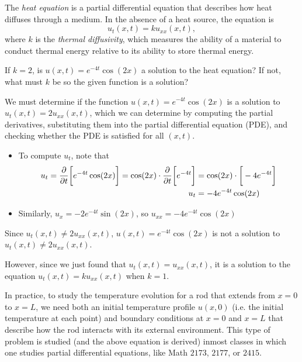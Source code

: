 \documentclass[noauthor,handout]{ximera}
\begin{document}
\begin{problem}
The \emph{heat equation} is a partial differential equation that describes how heat diffuses through a medium.  In the absence of a heat source, the equation is
\[
u_t(x,t) = k u_{xx}(x,t),
\]
where $k$ is the \emph{thermal diffusivity}, which measures the ability of a material to conduct thermal energy relative to its ability to store thermal energy.

If $k=2$, is $u(x,t) = e^{-4t}\cos(2x)$ a solution to the heat equation?  If not, what must $k$ be so the given function is a solution?

\begin{freeResponse}

We must determine if the function $u(x,t) = e^{-4t}\cos(2x)$ is a solution to $u_t(x,t) = 2 u_{xx}(x,t)$, which we can determine by computing the partial derivatives, substituting them into the partial differential equation (PDE), and checking whether the PDE is satisfied for all $(x,t)$.

\begin{itemize}
\item To compute $u_t$, note that 
\begin{align*}
u_t = \frac{\partial }{\partial t} \bigg[ e^{-4t}\cos(2x) \bigg] = \cos(2x) \cdot \frac{\partial }{\partial t} \bigg[ e^{-4t} \bigg] &= \cos(2x) \cdot \bigg[ -4e^{-4t} \bigg] \\
u_t &= -4e^{-4t}\cos(2x)
\end{align*}
\item Similarly,  $u_x = -2e^{-4t}\sin(2x)$, so $u_{xx} =-4e^{-4t}\cos(2x)$
\end{itemize}

Since $u_t(x,t) \neq 2 u_{xx}(x,t)$, $u(x,t) = e^{-4t}\cos(2x)$ is not a solution to $u_t(x,t) \neq 2 u_{xx}(x,t)$.

However, since we just found that $u_t(x,t) = u_{xx}(x,t)$, it is a solution to the equation $u_t(x,t) = k u_{xx}(x,t)$ when $k=1$.

\begin{remark}
In practice, to study the temperature evolution for a rod that extends from $x=0$ to $x=L$, we need both an initial temperature profile $u(x,0)$ (i.e. the initial temperature at each point) and boundary conditions at $x=0$ and $x=L$ that describe how the rod interacts with its external environment.  This type of problem is studied (and the above equation is derived) inmost classes in which one studies partial differential equations, like Math $2173$, $2177$, or $2415$.
\end{remark}

\end{freeResponse}


\end{problem}
\end{document}
